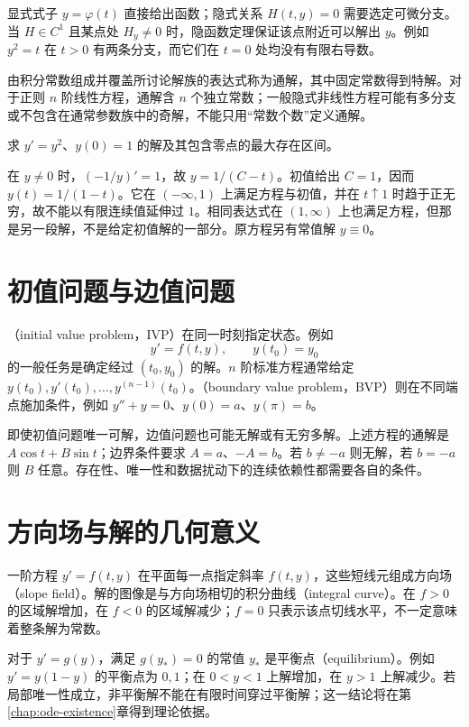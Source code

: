 \documentclass[UTF8,12pt,a4paper,fontset=fandol]{ctexbook}
\begin{document}
显式式子 $y=\varphi(t)$ 直接给出函数；隐式关系 $H(t,y)=0$ 需要选定可微分支。当 $H\in C^1$ 且某点处 $H_y\ne0$ 时，隐函数定理保证该点附近可以解出 $y$。例如 $y^2=t$ 在 $t>0$ 有两条分支，而它们在 $t=0$ 处均没有有限右导数。

由积分常数组成并覆盖所讨论解族的表达式称为通解，其中固定常数得到特解。对于正则 $n$ 阶线性方程，通解含 $n$ 个独立常数；一般隐式非线性方程可能有多分支或不包含在通常参数族中的奇解，不能只用“常数个数”定义通解。

\begin{example}[表达式与最大区间]
求 $y'=y^2$、$y(0)=1$ 的解及其包含零点的最大存在区间。
\end{example}
\begin{solve}
在 $y\ne0$ 时，$(-1/y)'=1$，故 $y=1/(C-t)$。初值给出 $C=1$，因而 $y(t)=1/(1-t)$。它在 $(-\infty,1)$ 上满足方程与初值，并在 $t\uparrow1$ 时趋于正无穷，故不能以有限连续值延伸过 $1$。相同表达式在 $(1,\infty)$ 上也满足方程，但那是另一段解，不是给定初值解的一部分。原方程另有常值解 $y\equiv0$。
\end{solve}

\section{初值问题与边值问题}
（initial value problem，IVP）在同一时刻指定状态。例如
\begin{equation}
 y'=f(t,y),\qquad y(t_0)=y_0
 \label{eq:ode-scalar-ivp}
\end{equation}
的一般任务是确定经过 $(t_0,y_0)$ 的解。$n$ 阶标准方程通常给定 $y(t_0),y'(t_0),\ldots,y^{(n-1)}(t_0)$。（boundary value problem，BVP）则在不同端点施加条件，例如 $y''+y=0$、$y(0)=a$、$y(\pi)=b$。

即使初值问题唯一可解，边值问题也可能无解或有无穷多解。上述方程的通解是 $A\cos t+B\sin t$；边界条件要求 $A=a$、$-A=b$。若 $b\ne-a$ 则无解，若 $b=-a$ 则 $B$ 任意。存在性、唯一性和数据扰动下的连续依赖性都需要各自的条件。

\section{方向场与解的几何意义}
一阶方程 $y'=f(t,y)$ 在平面每一点指定斜率 $f(t,y)$，这些短线元组成方向场（slope field）。解的图像是与方向场相切的积分曲线（integral curve）。在 $f>0$ 的区域解增加，在 $f<0$ 的区域解减少；$f=0$ 只表示该点切线水平，不一定意味着整条解为常数。

对于 $y'=g(y)$，满足 $g(y_*)=0$ 的常值 $y_*$ 是平衡点（equilibrium）。例如 $y'=y(1-y)$ 的平衡点为 $0,1$；在 $0<y<1$ 上解增加，在 $y>1$ 上解减少。若局部唯一性成立，非平衡解不能在有限时间穿过平衡解；这一结论将在第\ref{chap:ode-existence}章得到理论依据。
\end{document}
